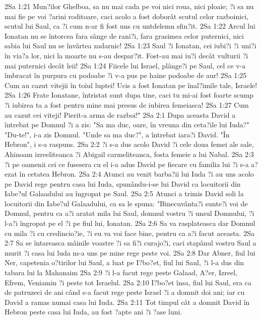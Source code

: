 2Sa 1:21  Mun?ilor Ghelboa, sa nu mai cada pe voi nici roua, nici ploaie; ?i sa nu mai fie pe voi ?arini roditoare, caci acolo a fost doborât scutul celor razboinici, scutul lui Saul, ca ?i cum n-ar fi fost uns cu untdelemn sfin?it.
2Sa 1:22  Arcul lui Ionatan nu se întorcea fara sânge de rani?i, fara grasimea celor puternici, nici sabia lui Saul nu se învârtea zadarnic!
2Sa 1:23  Saul ?i Ionatan, cei iubi?i ?i uni?i în via?a lor, nici la moarte nu s-au despar?it. Fost-au mai iu?i decât vulturii ?i mai puternici decât leii!
2Sa 1:24  Fiicele lui Israel, plânge?i pe Saul, cel ce v-a îmbracat în purpura cu podoabe ?i v-a pus pe haine podoabe de aur!
2Sa 1:25  Cum au cazut vitejii în toiul luptei! Ucis a fost Ionatan pe înal?imile tale, Israele!
2Sa 1:26  Frate Ionatane, întristat sunt dupa tine, caci tu mi-ai fost foarte scump ?i iubirea ta a fost pentru mine mai presus de iubirea femeiasca!
2Sa 1:27  Cum au cazut cei viteji! Pierit-a arma de razboi!"
2Sa 2:1  Dupa aceasta David a întrebat pe Domnul ?i a zis: "Sa ma duc, oare, în vreuna din ceta?ile lui Iuda?" "Du-te!", i-a zis Domnul. "Unde sa ma duc?", a întrebat iara?i David. "În Hebron", i s-a raspuns.
2Sa 2:2  ?i s-a dus acolo David ?i cele doua femei ale sale, Ahinoam izreeliteanca ?i Abigail carmeliteanca, fosta femeie a lui Nabal.
2Sa 2:3  ?i pe oamenii cei ce fusesera cu el i-a adus David pe fiecare cu familia lui ?i s-a a?ezat în cetatea Hebron.
2Sa 2:4  Atunci au venit barba?ii lui Iuda ?i au uns acolo pe David rege pentru casa lui Iuda, spunându-i-se lui David ca locuitorii din Iabe?ul Galaadului au îngropat pe Saul.
2Sa 2:5  Atunci a trimis David soli la locuitorii din Iabe?ul Galaadului, ca sa le spuna: "Binecuvânta?i sunte?i voi de Domnul, pentru ca a?i aratat mila lui Saul, domnul vostru ?i unsul Domnului, ?i l-a?i îngropat pe el ?i pe fiul lui, Ionatan.
2Sa 2:6  Sa va rasplateasca dar Domnul cu mila ?i cu credincio?ie, ?i eu va voi face bine, pentru ca a?i facut aceasta.
2Sa 2:7  Sa se întareasca mâinile voastre ?i sa fi?i curajo?i, caci stapânul vostru Saul a murit ?i casa lui luda m-a uns pe mine rege peste voi.
2Sa 2:8  Dar Abner, fiul lui Ner, capetenia o?tirilor lui Saul, a luat pe I?bo?et, fiul lui Saul, ?i l-a dus din tabara lui la Mahanaim
2Sa 2:9  ?i l-a facut rege peste Galaad, A?er, Izreel, Efrem, Veniamin ?i peste tot Israelul.
2Sa 2:10  I?bo?et însa, fiul lui Saul, era ca de patruzeci de ani când s-a facut rege peste Israel ?i a domnit doi ani; iar cu David a ramas numai casa lui Iuda.
2Sa 2:11  Tot timpul cât a domnit David în Hebron peste casa lui Iuda, au fost ?apte ani ?i ?ase luni.
